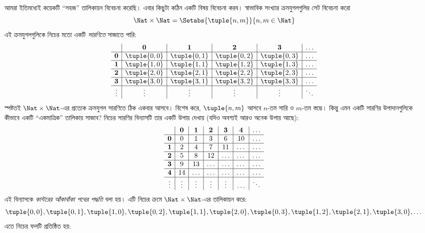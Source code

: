 \documentclass[../../../include/open-logic-section]{subfiles}
\begin{document}


\begin{explain}
আমরা ইতিমধ্যেই কয়েকটি ``সহজ'' তালিকায়ন বিবেচনা করেছি। এবার কিছুটা কঠিন একটি বিষয় বিবেচনা করব। স্বাভাবিক সংখ্যার ক্রমযুগলগুলির সেট বিবেচনা করো
\[
\Nat \times \Nat = \Setabs{\tuple{n,m}}{n,m \in \Nat}
\]
এই ক্রমযুগলগুলিকে নিচের মতো একটি \emph{সারণিতে} সাজাতে পারি:
\[
\begin{array}{ c | c | c | c | c | c}
& \mathbf 0 & \mathbf 1 & \mathbf 2 & \mathbf 3 & \dots \\
\hline
\mathbf 0 & \tuple{0,0} & \tuple{0,1} & \tuple{0,2} & \tuple{0,3} & \dots \\
\hline
\mathbf 1 & \tuple{1,0} & \tuple{1,1} & \tuple{1,2} & \tuple{1,3} & \dots \\
\hline
\mathbf 2 & \tuple{2,0} & \tuple{2,1} & \tuple{2,2} & \tuple{2,3} & \dots \\
\hline
\mathbf 3 & \tuple{3,0} & \tuple{3,1} & \tuple{3,2} & \tuple{3,3} & \dots \\
\hline
\vdots & \vdots & \vdots & \vdots & \vdots & \ddots\\
\end{array}
\]
স্পষ্টতই $\Nat \times \Nat$-এর প্রত্যেক ক্রমযুগল সারণিতে ঠিক একবার আসবে। বিশেষ করে, $\tuple{n,m}$ আসবে $n$-তম সারি ও $m$-তম স্তম্ভে। কিন্তু এমন একটি সারণির উপাদানগুলিকে কীভাবে একটি ``একমাত্রিক'' তালিকায় সাজাব? নিচের সারণির বিন্যাসটি তার একটি উপায় দেখায় (যদিও অবশ্যই আরও অনেক উপায় আছে):
\[
\begin{array}{ c | c | c | c | c | c | c}
& \mathbf 0 & \mathbf 1 & \mathbf 2 & \mathbf 3 & \mathbf 4 &\dots \\
\hline
\mathbf 0 & 0  & 1& 3 & 6& 10 &\ldots \\
\hline
\mathbf 1 &2 & 4& 7 & 11 & \dots &\ldots \\
\hline
\mathbf 2 & 5 & 8 & 12 & \ldots & \dots&\ldots \\
\hline
\mathbf 3 & 9 & 13 & \ldots & \ldots & \dots & \ldots \\
\hline
\mathbf 4 & 14 & \ldots & \ldots & \ldots & \dots & \ldots \\
\hline
\vdots & \vdots & \vdots & \vdots & \vdots&\ldots & \ddots\\
\end{array}
\]\noindent
এই বিন্যাসকে \emph{কান্টরের আঁকাবাঁকা পথের পদ্ধতি} বলা হয়। এটি নিচের ক্রমে $\Nat \times \Nat$-এর তালিকায়ন করে:
\[
\tuple{0,0}, \tuple{0,1}, \tuple{1,0}, \tuple{0,2}, \tuple{1,1},
\tuple{2,0}, \tuple{0,3}, \tuple{1,2}, \tuple{2,1}, \tuple{3,0}, \dots
\]
এতে নিচের ফলটি প্রতিষ্ঠিত হয়:
\end{explain}
\end{document}
